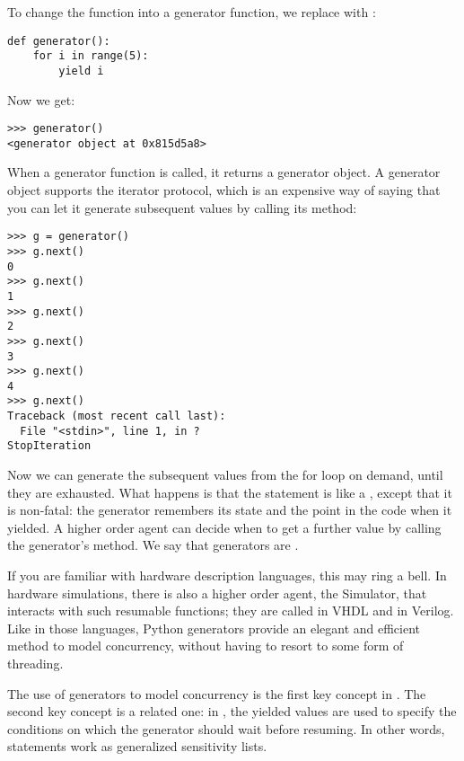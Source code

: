 To change the function into a generator function, we replace
 with :

\begin{verbatim}
def generator():
    for i in range(5):
        yield i
\end{verbatim}

Now we get:

\begin{verbatim}
>>> generator()
<generator object at 0x815d5a8>
\end{verbatim}

When a generator function is called, it returns a generator object. A
generator object supports the iterator protocol, which is an expensive
way of saying that you can let it generate subsequent values by
calling its  method:

\begin{verbatim}
>>> g = generator()
>>> g.next()
0
>>> g.next()
1
>>> g.next()
2
>>> g.next()
3
>>> g.next()
4
>>> g.next()
Traceback (most recent call last):
  File "<stdin>", line 1, in ?
StopIteration
\end{verbatim}

Now we can generate the subsequent values from the for loop on demand,
until they are exhausted. What happens is that the
 statement is like a
, except that it is non-fatal: the generator remembers
its state and the point in the code when it yielded. A higher order
agent can decide when to get a further value by calling the
generator's  method. We say that generators are
.

If you are familiar with hardware description languages, this may ring
a bell. In hardware simulations, there is also a higher order agent,
the Simulator, that interacts with such resumable functions; they are
called 
%
 in VHDL and 
%
 in
Verilog. Like in those languages, Python generators provide an elegant
and efficient method to model concurrency, without having to resort to
some form of threading.

The use of generators to model concurrency is the first key concept in
\myhdl{}. The second key concept is a related one: in \myhdl{}, the
yielded values are used to specify the conditions on which the
generator should wait before resuming. In other words, 
statements work as generalized 
sensitivity lists. 

